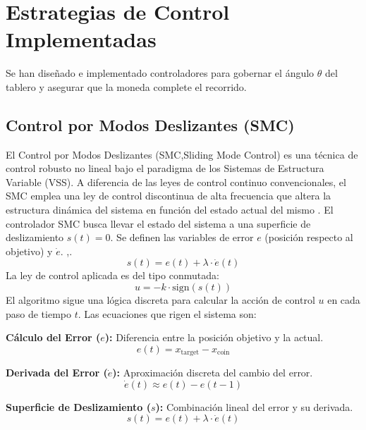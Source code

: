 \documentclass[
A4paper,            1 paper size A4
oneside,            %
openright,          %
10pt,               %
headings=normal,    %
titlepage=on        %
]{article}
\begin{document}
\section{Estrategias de Control Implementadas}
Se han diseñado e implementado controladores para gobernar el ángulo $\theta$ del tablero y asegurar que la moneda complete el recorrido.

\subsection{Control por Modos Deslizantes (SMC)}

El Control por Modos Deslizantes (SMC,Sliding Mode Control) es una técnica de control robusto no lineal  bajo el paradigma de los Sistemas de Estructura Variable (VSS). A diferencia de las leyes de control continuo convencionales, el SMC emplea una ley de control discontinua de alta frecuencia que altera la estructura dinámica del sistema en función del estado actual del mismo . El controlador SMC busca llevar el estado del sistema a una superficie de deslizamiento $s(t) = 0$. Se definen las variables de error $e$ (posición respecto al objetivo) y $\dot{e}$.
\cite{shtessel2014sliding},\cite{Adaptive_slidingmode}.
\begin{equation}
    s(t) = e(t) + \lambda \cdot \dot{e}(t)
\end{equation}
La ley de control aplicada es del tipo conmutada:
\begin{equation}
    u = -k \cdot \text{sign}(s(t))
\end{equation}
El algoritmo sigue una lógica discreta para calcular la acción de control $u$ en cada paso de tiempo $t$. Las ecuaciones que rigen el sistema son:

\textbf{Cálculo del Error ($e$):} Diferencia entre la posición objetivo y la actual.
\begin{equation}
    e(t) = x_{\text{target}} - x_{\text{coin}}
\end{equation}

\textbf{Derivada del Error ($\dot{e}$):} Aproximación discreta del cambio del error.
\begin{equation}
    \dot{e}(t) \approx e(t) - e(t-1)
\end{equation}

\textbf{Superficie de Deslizamiento ($s$):} Combinación lineal del error y su derivada.
\begin{equation}
    s(t) = e(t) + \lambda \cdot \dot{e}(t)
\end{equation}
\end{document}
